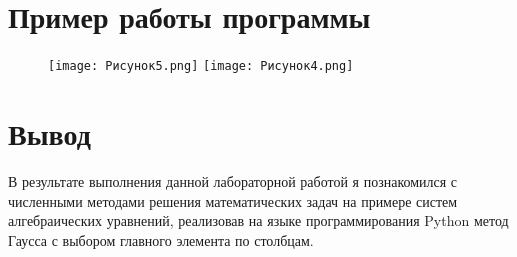 \documentclass[12pt]{report}
\begin{document}
\section*{Пример работы программы}

\begin{figure}[h]
        \centering
        \texttt{[image: Рисунок5.png]}
        \texttt{[image: Рисунок4.png]}
\end{figure}

\section*{Вывод}
В результате выполнения данной лабораторной работой я познакомился с численными методами решения математических задач на примере систем алгебраических уравнений, реализовав на языке программирования Python метод Гаусса с выбором главного элемента по столбцам.
\end{document}
